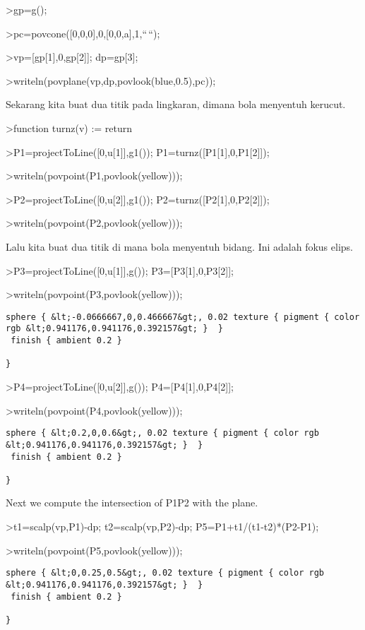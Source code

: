 \documentclass[
]{book}
\begin{document}
\textgreater gp=g();

\textgreater pc=povcone({[}0,0,0{]},0,{[}0,0,a{]},1,``\,``);

\textgreater vp={[}gp{[}1{]},0,gp{[}2{]}{]}; dp=gp{[}3{]};

\textgreater writeln(povplane(vp,dp,povlook(blue,0.5),pc));

Sekarang kita buat dua titik pada lingkaran, dimana bola menyentuh kerucut.

\textgreater function turnz(v) := return

\textgreater P1=projectToLine({[}0,u{[}1{]}{]},g1()); P1=turnz({[}P1{[}1{]},0,P1{[}2{]}{]});

\textgreater writeln(povpoint(P1,povlook(yellow)));

\textgreater P2=projectToLine({[}0,u{[}2{]}{]},g1()); P2=turnz({[}P2{[}1{]},0,P2{[}2{]}{]});

\textgreater writeln(povpoint(P2,povlook(yellow)));

Lalu kita buat dua titik di mana bola menyentuh bidang. Ini adalah fokus elips.

\textgreater P3=projectToLine({[}0,u{[}1{]}{]},g()); P3={[}P3{[}1{]},0,P3{[}2{]}{]};

\textgreater writeln(povpoint(P3,povlook(yellow)));

\begin{verbatim}
sphere { &lt;-0.0666667,0,0.466667&gt;, 0.02 texture { pigment { color rgb &lt;0.941176,0.941176,0.392157&gt; }  } 
 finish { ambient 0.2 } 

}
\end{verbatim}

\textgreater P4=projectToLine({[}0,u{[}2{]}{]},g()); P4={[}P4{[}1{]},0,P4{[}2{]}{]};

\textgreater writeln(povpoint(P4,povlook(yellow)));

\begin{verbatim}
sphere { &lt;0.2,0,0.6&gt;, 0.02 texture { pigment { color rgb &lt;0.941176,0.941176,0.392157&gt; }  } 
 finish { ambient 0.2 } 

}
\end{verbatim}

Next we compute the intersection of P1P2 with the plane.

\textgreater t1=scalp(vp,P1)-dp; t2=scalp(vp,P2)-dp; P5=P1+t1/(t1-t2)*(P2-P1);

\textgreater writeln(povpoint(P5,povlook(yellow)));

\begin{verbatim}
sphere { &lt;0,0.25,0.5&gt;, 0.02 texture { pigment { color rgb &lt;0.941176,0.941176,0.392157&gt; }  } 
 finish { ambient 0.2 } 

}
\end{verbatim}
\end{document}
